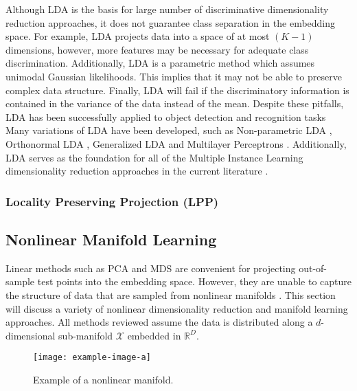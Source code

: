 Although LDA is the basis for large number of discriminative dimensionality reduction approaches, it does not guarantee class separation in the embedding space.  For example, LDA projects data into a space of at most $(K-1)$ dimensions, however, more features may be necessary for adequate class discrimination.  Additionally, LDA is a parametric method which assumes unimodal Gaussian likelihoods.  This implies that it may not be able to preserve complex data structure.  Finally, LDA will fail if the discriminatory information is contained in the variance of the data instead of the mean.  Despite these pitfalls, LDA  has been successfully applied to object detection and recognition tasks \citep{Wang2016OrthogonalLDA}  Many variations of LDA have been developed, such as Non-parametric LDA \citep{Fukunaga1983NonparametricLDA}, Orthonormal LDA \citep{Wang2016OrthogonalLDA}, Generalized LDA \citep{Baudat2000GeneralizedDiscriminantAnalysis} and Multilayer Perceptrons \citep{Webb1990MLPLDA}.  Additionally, LDA serves as the foundation for all of the Multiple Instance Learning dimensionality reduction approaches in the current literature \citep{Sun2010MIDR,Chai2014MIDA,Zhu2018MIDRSparsity}.

\subsubsection{Locality Preserving Projection (LPP)}



\subsection{Nonlinear Manifold Learning}

Linear methods such as PCA and MDS are convenient for projecting out-of-sample test points into the embedding space.  However, they are unable to capture the structure of data that are sampled from nonlinear manifolds \citep{Kegl2008PrincipalManifoldsTextbook}. This section will discuss a variety of nonlinear dimensionality reduction and manifold learning approaches.  All methods reviewed assume the data is distributed along a $d$-dimensional sub-manifold $\mathcal{X}$ embedded in $\mathbb{R}^{D}$.

\begin{center}
	\begin{figure*}[h]
		\centering
		\texttt{[image: example-image-a]}
		\caption[Example of a nonlinear manifold.]{Example of a nonlinear manifold.}
		\label{fig:nonlinear_manifold}
	\end{figure*}
\end{center}

